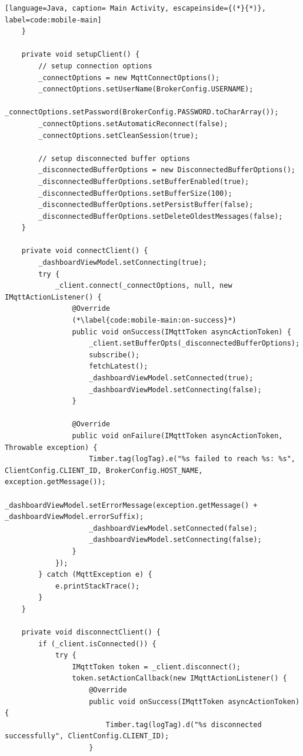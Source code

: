 \begin{lstlisting}[language=Java, caption= Main Activity, escapeinside={(*}{*)}, label=code:mobile-main]
    }

    private void setupClient() {
        // setup connection options
        _connectOptions = new MqttConnectOptions();
        _connectOptions.setUserName(BrokerConfig.USERNAME);
        _connectOptions.setPassword(BrokerConfig.PASSWORD.toCharArray());
        _connectOptions.setAutomaticReconnect(false);
        _connectOptions.setCleanSession(true);

        // setup disconnected buffer options
        _disconnectedBufferOptions = new DisconnectedBufferOptions();
        _disconnectedBufferOptions.setBufferEnabled(true);
        _disconnectedBufferOptions.setBufferSize(100);
        _disconnectedBufferOptions.setPersistBuffer(false);
        _disconnectedBufferOptions.setDeleteOldestMessages(false);
    }

    private void connectClient() {
        _dashboardViewModel.setConnecting(true);
        try {
            _client.connect(_connectOptions, null, new IMqttActionListener() {
                @Override
                (*\label{code:mobile-main:on-success}*)
                public void onSuccess(IMqttToken asyncActionToken) {
                    _client.setBufferOpts(_disconnectedBufferOptions);
                    subscribe();
                    fetchLatest();
                    _dashboardViewModel.setConnected(true);
                    _dashboardViewModel.setConnecting(false);
                }

                @Override
                public void onFailure(IMqttToken asyncActionToken, Throwable exception) {
                    Timber.tag(logTag).e("%s failed to reach %s: %s", ClientConfig.CLIENT_ID, BrokerConfig.HOST_NAME, exception.getMessage());
                    _dashboardViewModel.setErrorMessage(exception.getMessage() + _dashboardViewModel.errorSuffix);
                    _dashboardViewModel.setConnected(false);
                    _dashboardViewModel.setConnecting(false);
                }
            });
        } catch (MqttException e) {
            e.printStackTrace();
        }
    }

    private void disconnectClient() {
        if (_client.isConnected()) {
            try {
                IMqttToken token = _client.disconnect();
                token.setActionCallback(new IMqttActionListener() {
                    @Override
                    public void onSuccess(IMqttToken asyncActionToken) {
                        Timber.tag(logTag).d("%s disconnected successfully", ClientConfig.CLIENT_ID);
                    }


\end{lstlisting}
